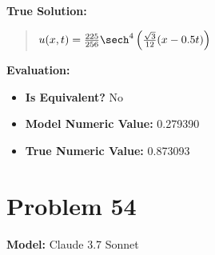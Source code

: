 \documentclass{article}
\begin{document}
\textbf{True Solution:}
\begin{quote}
$u(x,t) = \frac{225}{256} \sech^4\left( \frac{\sqrt{3}}{12}(x - 0.5t) \right)$
\end{quote}

\textbf{Evaluation:}
\begin{itemize}
\item \textbf{Is Equivalent?} No
\item \textbf{Model Numeric Value:} 0.279390
\item \textbf{True Numeric Value:} 0.873093
\end{itemize}
\vspace{1cm}
\section*{Problem 54}
\textbf{Model:} Claude 3.7 Sonnet
\end{document}
